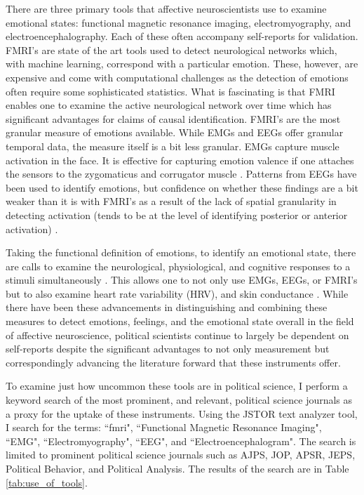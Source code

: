 \documentclass[12pt]{article}
\begin{document}
There are three primary tools that affective neuroscientists use to examine emotional states: functional magnetic resonance imaging, electromyography, and electroencephalography. Each of these often accompany self-reports for validation. FMRI's are state of the art tools used to detect neurological networks which, with machine learning, correspond with a particular emotion. These, however, are expensive and come with computational challenges as the detection of emotions often require some sophisticated statistics. What is fascinating is that FMRI enables one to examine the active neurological network over time which has significant advantages for claims of causal identification. FMRI's are the most granular measure of emotions available. While EMGs and EEGs offer granular temporal data, the measure itself is a bit less granular. EMGs capture muscle activation in the face. It is effective for capturing emotion valence if one attaches the sensors to the zygomaticus and corrugator muscle \citep{bakker_et-al_2020_apsr}. Patterns from EEGs have been used to identify emotions, but confidence on whether these findings are a bit weaker than it is with FMRI's as a result of the lack of spatial granularity in detecting activation (tends to be at the level of identifying posterior or anterior activation) \citep{mauss_robinson_2009_ce}.

Taking the functional definition of emotions, to identify an emotional state, there are calls to examine the neurological, physiological, and cognitive responses to a stimuli simultaneously \citep{ralph_anderson_2018}. This allows one to not only use EMGs, EEGs, or FMRI's but to also examine heart rate variability (HRV), and skin conductance \citep{ralph_anderson_2018}. While there have been these advancements in distinguishing and combining these measures to detect emotions, feelings, and the emotional state overall in the field of affective neuroscience, political scientists continue to largely be dependent on self-reports despite the significant advantages to not only measurement but correspondingly advancing the literature forward that these instruments offer. 

To examine just how uncommon these tools are in political science, I perform a keyword search of the most prominent, and relevant, political science journals as a proxy for the uptake of these instruments. Using the JSTOR text analyzer tool, I search for the terms: ``fmri", ``Functional Magnetic Resonance Imaging", ``EMG", ``Electromyography", ``EEG", and ``Electroencephalogram". The search is limited to prominent political science journals such as AJPS, JOP, APSR, JEPS, Political Behavior, and Political Analysis. The results of the search are in Table \ref{tab:use_of_tools}.
\end{document}
